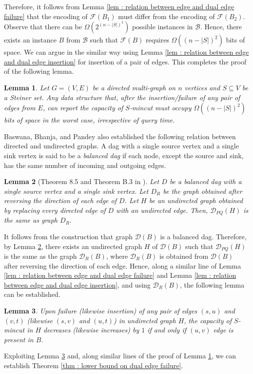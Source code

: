 \documentclass[letterpaper,11pt]{article}
\newtheorem{lemma}{Lemma}[]
\begin{document}
Therefore, it follows from Lemma \ref{lem : relation between edge and dual edge failure} that the encoding of ${\mathcal F}(B_1)$ must differ from the encoding of ${\mathcal F}(B_2)$. Observe that there can be $\Omega(2^{(n-|S|)^2})$ possible instances in ${\mathcal B}$. Hence, there exists an instance $B$ from ${\mathcal B}$ such that ${\mathcal F}(B)$ requires $\Omega((n-|S|)^2)$ bits of space. We can argue in the similar way using Lemma \ref{lem : relation between edge and dual edge insertion} for insertion of a pair of edges. This completes the proof of the following lemma.
\begin{lemma} \label{lem : dual edge failure directed}
    Let $G=(V,E)$ be a directed multi-graph on $n$ vertices and $S\subseteq V$ be a Steiner set. Any data structure that, after the insertion/failure of any pair of edges from $E$, can report the capacity of $S$-mincut must occupy $\Omega((n-|S|)^2)$ bits of space in the worst case, irrespective of query time.  
\end{lemma}
Baswana, Bhanja, and Pandey \cite{DBLP:journals/talg/BaswanaBP23} also established the following relation between directed and undirected graphs. A dag with a single source vertex and a single sink vertex is said to be a \textit{balanced dag} if each node, except the source and sink, has the same number of incoming and outgoing edges. 
\begin{lemma}[Theorem 8.5 and Theorem B.3 in \cite{DBLP:journals/talg/BaswanaBP23}] \label{lem : undirected graph exists}
    Let $D$ be a balanced dag with a single source vertex and a single sink vertex. Let $D_R$ be the graph obtained after reversing the direction of each edge of $D$. Let $H$ be an undirected graph obtained by replacing every directed edge of $D$ with an undirected edge. Then, ${\mathcal D}_{PQ}(H)$ is the same as graph $D_R$. 
\end{lemma}
It follows from the construction that graph ${\mathcal D}(B)$ is a balanced dag. Therefore, by Lemma \ref{lem : undirected graph exists}, there exists an undirected graph $H$ of ${\mathcal D}(B)$ such that ${\mathcal D}_{PQ}(H)$ is the same as the graph ${\mathcal D}_R(B)$, where ${\mathcal D}_R(B)$ is obtained from ${\mathcal D}(B)$ after reversing the direction of each edge. Hence, along a similar line of Lemma \ref{lem : relation between edge and dual edge failure} and Lemma \ref{lem : relation between edge and dual edge insertion}, and using ${\mathcal D}_R(B)$, the following lemma can be established.
\begin{lemma} \label{lem : undirected lower bound}
    Upon failure (likewise insertion) of any pair of edges $(s,u)$ and $(v,t)$ (likewise $(s,v)$ and $(u,t)$) in undirected graph $H$, the capacity of $S$-mincut in $H$ decreases (likewise increases) by $1$ if and only if $(u,v)$ edge is present in $B$.
\end{lemma}
Exploiting Lemma \ref{lem : undirected lower bound} and, along similar lines of the proof of Lemma \ref{lem : dual edge failure directed}, we can establish Theorem \ref{thm : lower bound on dual edge failure}.
\end{document}
